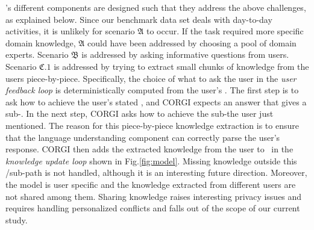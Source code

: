 \vspace{-0.5em}
\CORGI's different components are designed such that they address the above challenges, as explained below.
Since our benchmark data set deals with day-to-day activities, it is unlikely for scenario $\mathfrak{A}$ to occur. If the task required more specific domain knowledge, $\mathfrak{A}$ could have been addressed by choosing a pool of domain experts. Scenario $\mathfrak{B}$ is addressed by asking informative questions from users. 
Scenario $\mathfrak{C}.1$ is addressed by trying to extract small chunks of knowledge from the users piece-by-piece. Specifically, the choice of what to ask the user in the \emph{user feedback loop} is deterministically computed from the user's \textGoal. The first step is to ask how to achieve the user’s stated \textGoal, and CORGI expects an answer that gives a sub-\textGoal. In the next step, CORGI asks %
how to achieve the sub-\textGoal the user just mentioned. 
The reason for this piece-by-piece knowledge extraction is to ensure that the language understanding component can correctly parse the user's response. CORGI then adds the extracted knowledge from the user to \KB~in the \emph{knowledge update loop} shown in Fig.\ref{fig:model}. Missing knowledge outside this \textGoal/sub-\textGoal path is not handled, although it is an interesting future direction. Moreover, the model is user specific and the knowledge extracted from different users are not shared among them. Sharing knowledge raises interesting privacy issues and requires handling personalized conflicts and falls out of the scope of our current study.

